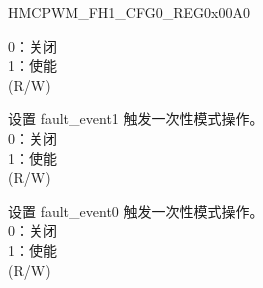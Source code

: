 \begin{register}{H}{MCPWM\_FH1\_CFG0\_REG}{0x00A0}
\begin{regdesc}
\begin{reglist}
0：关闭\\
1：使能\\
(R/W)
\label{fielddesc:MCPWMFH1F1OST}\item [MCPWM\_FH1\_F1\_OST] 设置 fault\_event1 触发一次性模式操作。\\
0：关闭\\
1：使能\\
(R/W)
\label{fielddesc:MCPWMFH1F0OST}\item [MCPWM\_FH1\_F0\_OST] 设置 fault\_event0 触发一次性模式操作。\\
0：关闭\\
1：使能\\
(R/W)
\item [见下页...]
\end{reglist}\end{regdesc}
\end{register}
\addtocounter{Regfloat}{-1}
